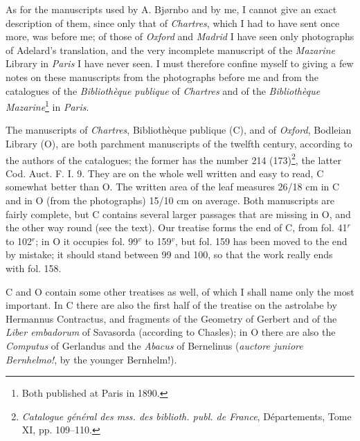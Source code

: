 \documentclass[11pt]{article}
\begin{document}
\par As for the manuscripts used by A. Bjørnbo and by me, I cannot give an exact description of them, since only that of \emph{Chartres}, which I had to have sent once more, was before me; of those of \emph{Oxford} and \emph{Madrid} I have seen only photographs of Adelard's translation, and the very incomplete manuscript of the \emph{Mazarine} Library in \emph{Paris} I have never seen. I must therefore confine myself to giving a few notes on these manuscripts from the photographs before me and from the catalogues of the \emph{Bibliothèque publique} of \emph{Chartres} and of the \emph{Bibliothèque Mazarine}\footnote{Both published at Paris in 1890.} in \emph{Paris}.\par
\par The manuscripts of \emph{Chartres}, Bibliothèque publique (C), and of \emph{Oxford}, Bodleian Library (O), are both parchment manuscripts of the twelfth century, according to the authors of the catalogues; the former has the number 214 (173)\footnote{\emph{Catalogue général des mss. des biblioth. publ. de France}, Départements, Tome XI, pp. 109–110.}, the latter Cod. Auct. F. I. 9. They are on the whole well written and easy to read, C somewhat better than O. The written area of the leaf measures 26/18 cm in C and in O (from the photographs) 15/10 cm on average. Both manuscripts are fairly complete, but C contains several larger passages that are missing in O, and the other way round (see the text). Our treatise forms the end of C, from fol. 41$^{r}$ to 102$^{r}$; in O it occupies fol. 99$^{v}$ to 159$^{v}$, but fol. 159 has been moved to the end by mistake; it should stand between 99 and 100, so that the work really ends with fol. 158.\par
\par C and O contain some other treatises as well, of which I shall name only the most important. In C there are also the first half of the treatise on the astrolabe by Hermannus Contractus, and fragments of the Geometry of Gerbert and of the \emph{Liber embadorum} of Savasorda (according to Chasles); in O there are also the \emph{Computus} of Gerlandus and the \emph{Abacus} of Bernelinus (\emph{auctore juniore Bernhelmo!}, by the younger Bernhelm!).\par
\end{document}
